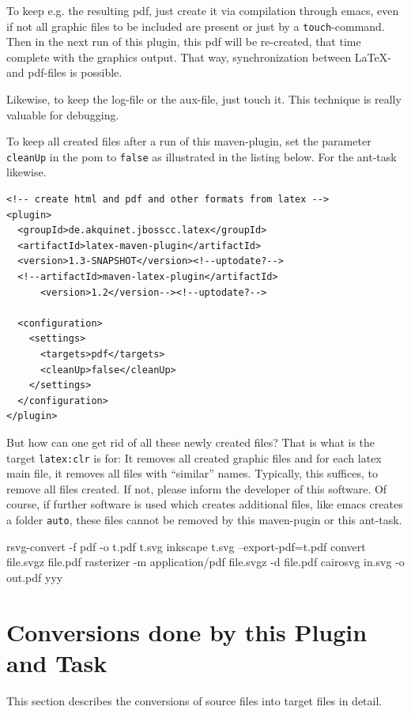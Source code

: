 \documentclass[12pt]{article}
\begin{document}
To keep e.g. the resulting pdf, 
just create it via compilation through emacs, 
even if not all graphic files to be included are present 
or just by a {\tt touch}-command. 
Then in the next run of this plugin, 
this pdf will be re-created, 
that time complete with the graphics output. 
That way, synchronization between \LaTeX- and pdf-files is possible. 

Likewise, to keep the log-file or the aux-file, just touch it. 
This technique is really valuable for debugging. 

To keep all created files after a run of this maven-plugin, 
set the parameter {\tt cleanUp} in the pom 
to {\tt false} as illustrated in the listing below. 
For the ant-task likewise. 
%
\lstset{language=xml, basicstyle=\small}
\begin{lstlisting}
<!-- create html and pdf and other formats from latex -->
<plugin>
  <groupId>de.akquinet.jbosscc.latex</groupId>
  <artifactId>latex-maven-plugin</artifactId>
  <version>1.3-SNAPSHOT</version><!--uptodate?-->
  <!--artifactId>maven-latex-plugin</artifactId>
      <version>1.2</version--><!--uptodate?-->
	
  <configuration>
    <settings>
      <targets>pdf</targets>
      <cleanUp>false</cleanUp>
    </settings>
  </configuration>
</plugin>
\end{lstlisting}


But how can one get rid of all these newly created files? 
That is what is the target {\tt latex:clr} is for: 
It removes all created graphic files 
and for each latex main file, it removes all files with ``similar'' names. 
Typically, this suffices, to remove all files created. 
If not, please inform the developer of this software. 
Of course, if further software is used which creates additional files, 
like emacs creates a folder {\tt auto}, 
these files cannot be removed by this maven-pugin or this ant-task. 


rsvg-convert -f pdf -o t.pdf t.svg
inkscape t.svg --export-pdf=t.pdf
convert file.svgz file.pdf 
rasterizer -m application/pdf file.svgz -d file.pdf
cairosvg in.svg -o out.pdf
yyy

\section{Conversions done by this Plugin and Task}\label{sec:conversions}

This section describes the conversions of source files into target files 
in detail. 
\end{document}
